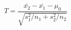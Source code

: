 \documentclass[10pt]{article}
\begin{document}
\[T=\frac{\bar{x_2}-\bar{x_1}-\mu_0}{\sqrt{s_1^2/n_1+s_2^2/n_2}}
\]
\end{document}
